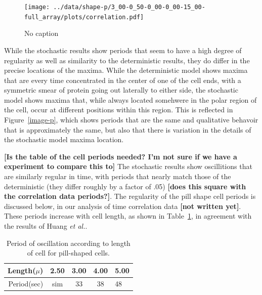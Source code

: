 \documentclass[letterpaper,twocolumn,amsmath,amssymb,pre]{revtex4-1}
\newcommand{\red}[1]{{\bf \color{red} #1}}
\newcommand{\fixme}[1]{\red{[#1]}}
\begin{document}
\begin{figure}
  \texttt{[image: ../data/shape-p/3\_00-0\_50-0\_00-0\_00-15\_00-full\_array/plots/correlation.pdf]}
  \caption{No caption}
  \label{corr-pill}
\end{figure}

While the stochastic results show periods that seem to have a high
degree of regularity as well as similarity to the deterministic
results, they do differ in the precise locations of the maxima.  While
the deterministic model shows maxima that are every time
concentrated in the center of one of the cell ends, with a symmetric
smear of protein going out laterally to either side, the stochastic
model shows maxima that, while always located somehwere in the polar
region of the cell, occur at different positions within this region.
This is reflected in Figure~\ref{image-p}, which shows periods that
are the same and qualitative behavoir that is approximately the same,
but also that there is variation in the details of the stochastic
model maxima location.


\fixme{Is the table of the cell periods needed? I'm not sure if we
  have a experiment to compare this to} The stochastic results show
oscillitions that are similarly regular in time, with periods that
nearly match those of the deterministic (they differ roughly by a
factor of .05) \fixme{does this square with the correlation data
  periods?}. The regularity of the pill shape cell periods is
discussed below, in our analysis of time correlation data \fixme{not
  written yet}.  These periods increase with cell length, as shown in
Table~\ref{tab:pill-periods}, in agreement with the results of Huang
\emph{et al.}.


\begin{table}
  \begin{tabular}{|r|c|c|c|l|}
    \hline Length($\mu$) & 2.50 & 3.00 & 4.00 & 5.00\\ \hline
    Period(sec) & sim & 33 & 38 & 48 \\ \cline{2-2} \hline
  \end{tabular}
  \caption{Period of oscillation according to length of cell for
    pill-shaped cells.}\label{tab:pill-periods}
\end{table}
\end{document}
